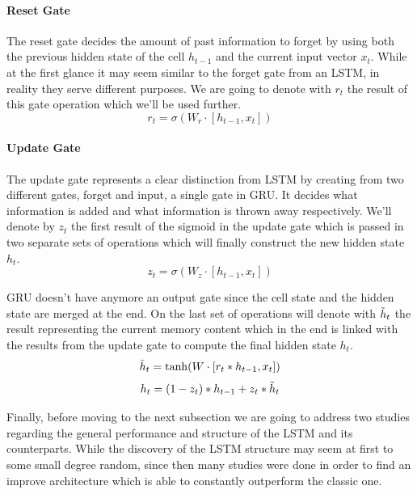 \paragraph{Reset Gate}\mbox{}

The reset gate decides the amount of past information to forget by using both the previous hidden state of the cell $\displaystyle h_{t-1}$ and the current input vector $\displaystyle x_t$. While at the first glance it may seem similar to the forget gate from an LSTM, in reality they serve different purposes. We are going to denote with $\displaystyle r_t$ the result of this gate operation which we'll be used further.
\[ r_t = \sigma(W_r\cdot[h_{t-1}, x_t])\]


\paragraph{Update Gate}\mbox{}

The update gate represents a clear distinction from LSTM by creating from two different gates, forget and input, a single gate in GRU. It decides what information is added and what information is thrown away respectively. We'll denote by $\displaystyle z_t$ the first result of the sigmoid in the update gate which is passed in two separate sets of operations which will finally construct the new hidden state $\displaystyle h_t$.
\[ z_t = \sigma(W_z\cdot[h_{t-1}, x_t])\]

GRU doesn't have anymore an output gate since the cell state and the hidden state are merged at the end. On the last set of operations will denote with $\displaystyle \Tilde{h}_t$ the result representing the current memory content which in the end is linked with the results from the update gate to compute the final hidden state $\displaystyle h_t$.
\[ \Tilde{h}_t = \tanh(W\cdot [r_t * h_{t-1}, x_t]) \]
\[ h_t = (1 - z_t) * h_{t-1} + z_t * \Tilde{h}_t\]

Finally, before moving to the next subsection we are going to address two studies regarding the general performance and structure of the LSTM and its counterparts. While the discovery of the LSTM structure may seem at first to some small degree random, since then many studies were done in order to find an improve architecture which is able to constantly outperform the classic one.

